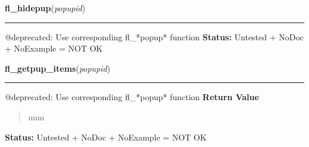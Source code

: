     \vspace{0.5ex}

\hspace{.8\funcindent}\begin{boxedminipage}{\funcwidth}

    \raggedright \textbf{fl\_hidepup}(\textit{popupid})

    \vspace{-1.5ex}

    \rule{\textwidth}{0.5\fboxrule}
\setlength{\parskip}{2ex}

@deprecated: Use corresponding fl\_*popup* function
\setlength{\parskip}{1ex}
\textbf{Status:} 
Untested + NoDoc + NoExample = NOT OK


    \end{boxedminipage}

    \label{xformslib:deprecated:fl_getpup_items}

    \vspace{0.5ex}

\hspace{.8\funcindent}\begin{boxedminipage}{\funcwidth}

    \raggedright \textbf{fl\_getpup\_items}(\textit{popupid})

    \vspace{-1.5ex}

    \rule{\textwidth}{0.5\fboxrule}
\setlength{\parskip}{2ex}

@deprecated: Use corresponding fl\_*popup* function
\setlength{\parskip}{1ex}
      \textbf{Return Value}
    \vspace{-1ex}

      \begin{quote}

num
      \end{quote}

\textbf{Status:} 
Untested + NoDoc + NoExample = NOT OK


    \end{boxedminipage}

    \label{xformslib:deprecated:fl_current_pup}

    \vspace{0.5ex}


